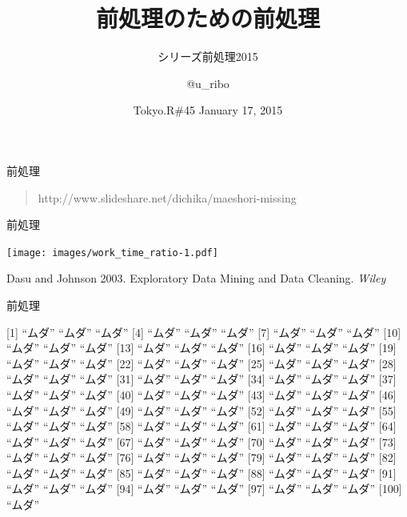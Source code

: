 \documentclass[17pt,ignorenonframetext,]{beamer}
\title{前処理のための前処理}
\subtitle{シリーズ前処理2015}
\author{@u\_ribo}
\date{Tokyo.R\#45 January 17, 2015}
\begin{document}
\frame{\titlepage}

\begin{frame}


\end{frame}

\begin{frame}{\faFood 前処理}


\begin{quote}
\scriptsize{\faLink http://www.slideshare.net/dichika/maeshori-missing}
\end{quote}

\end{frame}

\begin{frame}{\faFood 前処理}

\texttt{[image: images/work\_time\_ratio-1.pdf]}

\scriptsize{\faBook Dasu and Johnson 2003. Exploratory Data Mining and Data Cleaning. \textit{Wiley}}

\end{frame}

\begin{frame}{\faFood 前処理}


\end{frame}

\begin{frame}

{[}1{]} ``ムダ'' ``ムダ'' ``ムダ'' {[}4{]} ``ムダ'' ``ムダ'' ``ムダ''
{[}7{]} ``ムダ'' ``ムダ'' ``ムダ'' {[}10{]} ``ムダ'' ``ムダ'' ``ムダ''
{[}13{]} ``ムダ'' ``ムダ'' ``ムダ'' {[}16{]} ``ムダ'' ``ムダ'' ``ムダ''
{[}19{]} ``ムダ'' ``ムダ'' ``ムダ'' {[}22{]} ``ムダ'' ``ムダ'' ``ムダ''
{[}25{]} ``ムダ'' ``ムダ'' ``ムダ'' {[}28{]} ``ムダ'' ``ムダ'' ``ムダ''
{[}31{]} ``ムダ'' ``ムダ'' ``ムダ'' {[}34{]} ``ムダ'' ``ムダ'' ``ムダ''
{[}37{]} ``ムダ'' ``ムダ'' ``ムダ'' {[}40{]} ``ムダ'' ``ムダ'' ``ムダ''
{[}43{]} ``ムダ'' ``ムダ'' ``ムダ'' {[}46{]} ``ムダ'' ``ムダ'' ``ムダ''
{[}49{]} ``ムダ'' ``ムダ'' ``ムダ'' {[}52{]} ``ムダ'' ``ムダ'' ``ムダ''
{[}55{]} ``ムダ'' ``ムダ'' ``ムダ'' {[}58{]} ``ムダ'' ``ムダ'' ``ムダ''
{[}61{]} ``ムダ'' ``ムダ'' ``ムダ'' {[}64{]} ``ムダ'' ``ムダ'' ``ムダ''
{[}67{]} ``ムダ'' ``ムダ'' ``ムダ'' {[}70{]} ``ムダ'' ``ムダ'' ``ムダ''
{[}73{]} ``ムダ'' ``ムダ'' ``ムダ'' {[}76{]} ``ムダ'' ``ムダ'' ``ムダ''
{[}79{]} ``ムダ'' ``ムダ'' ``ムダ'' {[}82{]} ``ムダ'' ``ムダ'' ``ムダ''
{[}85{]} ``ムダ'' ``ムダ'' ``ムダ'' {[}88{]} ``ムダ'' ``ムダ'' ``ムダ''
{[}91{]} ``ムダ'' ``ムダ'' ``ムダ'' {[}94{]} ``ムダ'' ``ムダ'' ``ムダ''
{[}97{]} ``ムダ'' ``ムダ'' ``ムダ'' {[}100{]} ``ムダ''

\end{frame}
\end{document}
